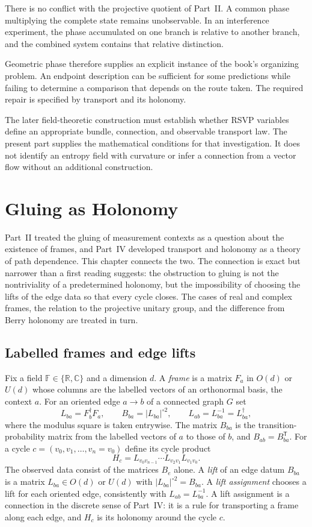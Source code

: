 \documentclass[11pt,oneside]{book}
\theoremstyle{definition}
\theoremstyle{remark}
\begin{document}
There is no conflict with the projective quotient of Part~II.
A common phase multiplying the complete state remains
unobservable. In an interference experiment, the phase accumulated
on one branch is relative to another branch, and the combined
system contains that relative distinction.

Geometric phase therefore supplies an explicit instance of the
book's organizing problem. An endpoint description can be
sufficient for some predictions while failing to determine a
comparison that depends on the route taken. The required repair
is specified by transport and its holonomy.

The later field-theoretic construction must establish whether
RSVP variables define an appropriate bundle, connection, and
observable transport law. The present part supplies the
mathematical conditions for that investigation. It does not
identify an entropy field with curvature or infer a connection
from a vector flow without an additional construction.

\chapter{Gluing as Holonomy}\label{ch:holgluing}

Part~II treated the gluing of measurement contexts as a question about the existence of frames, and Part~IV developed transport and holonomy as a theory of path dependence. This chapter connects the two. The connection is exact but narrower than a first reading suggests: the obstruction to gluing is not the nontriviality of a predetermined holonomy, but the impossibility of choosing the lifts of the edge data so that every cycle closes. The cases of real and complex frames, the relation to the projective unitary group, and the difference from Berry holonomy are treated in turn.

\section*{Labelled frames and edge lifts}

Fix a field $\mathbb F\in\{\mathbb R,\mathbb C\}$ and a dimension $d$. A \emph{frame} is a matrix $F_a$ in $O(d)$ or $U(d)$ whose columns are the labelled vectors of an orthonormal basis, the context $a$. For an oriented edge $a\to b$ of a connected graph $G$ set
\[
L_{ba}=F_b^{\dagger}F_a,\qquad B_{ba}=|L_{ba}|^{\circ2},\qquad L_{ab}=L_{ba}^{-1}=L_{ba}^{\dagger},
\]
where the modulus square is taken entrywise. The matrix $B_{ba}$ is the transition-probability matrix from the labelled vectors of $a$ to those of $b$, and $B_{ab}=B_{ba}^{\mathsf T}$. For a cycle $c=(v_0,v_1,\dots,v_n=v_0)$ define its cycle product
\[
H_c=L_{v_0v_{n-1}}\cdots L_{v_2v_1}L_{v_1v_0}.
\]
The observed data consist of the matrices $B_e$ alone. A \emph{lift} of an edge datum $B_{ba}$ is a matrix $L_{ba}\in O(d)$ or $U(d)$ with $|L_{ba}|^{\circ2}=B_{ba}$. A \emph{lift assignment} chooses a lift for each oriented edge, consistently with $L_{ab}=L_{ba}^{-1}$. A lift assignment is a connection in the discrete sense of Part~IV: it is a rule for transporting a frame along each edge, and $H_c$ is its holonomy around the cycle $c$.
\end{document}
